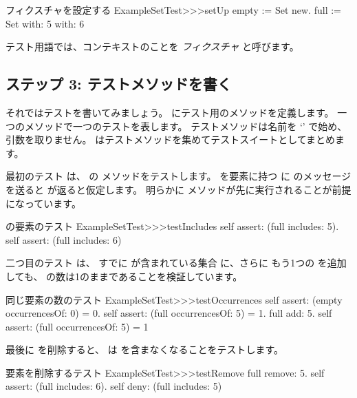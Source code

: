 \documentclass[a4paper,10pt,twoside]{book}
\begin{document}
\begin{method}[setupExampleSetTest]{フィクスチャを設定する}
ExampleSetTest>>>setUp
	empty := Set new.
	full := Set with: 5 with: 6
\end{method}

\noindent

テスト用語では、コンテキストのことを \emph{フィクスチャ} と呼びます。


\subsection{ステップ 3: テストメソッドを書く}

それではテストを書いてみましょう。
 にテスト用のメソッドを定義します。
一つのメソッドで一つのテストを表します。
テストメソッドは名前を `' で始め、引数を取りません。
\sunit はテストメソッドを集めてテストスイートとしてまとめます。


最初のテスト  は、  の  メソッドをテストします。
 を要素に持つ  に  のメッセージを送ると  が返ると仮定します。
明らかに  メソッドが先に実行されることが前提になっています。

\begin{method}[testIncludes]{ の要素のテスト}
ExampleSetTest>>>testIncludes
	self assert: (full includes: 5).
	self assert: (full includes: 6)
\end{method}

二つ目のテスト  は、 すでに  が含まれている集合 に、さらに もう1つの  を追加しても、  の数は1のままであることを検証しています。

\begin{method}[testOccurrences]{同じ要素の数のテスト}
ExampleSetTest>>>testOccurrences
	self assert: (empty occurrencesOf: 0) = 0.
	self assert: (full occurrencesOf: 5) = 1.
	full add: 5.
	self assert: (full occurrencesOf: 5) = 1
\end{method}

最後に  を削除すると、  は  を含まなくなることをテストします。

\begin{method}[testRemove]{要素を削除するテスト}
ExampleSetTest>>>testRemove
	full remove: 5.
	self assert: (full includes: 6).
	self deny: (full includes: 5)
\end{method}
\end{document}
